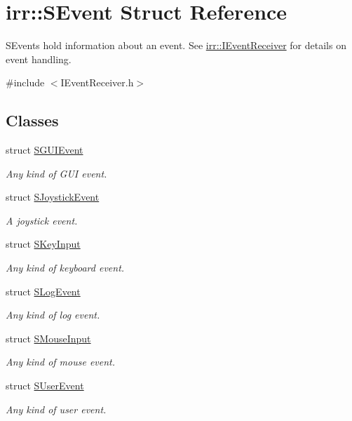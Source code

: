 \hypertarget{structirr_1_1SEvent}{}\section{irr\+:\+:S\+Event Struct Reference}
\label{structirr_1_1SEvent}


S\+Events hold information about an event. See \hyperlink{classirr_1_1IEventReceiver}{irr\+::\+I\+Event\+Receiver} for details on event handling.  




{\ttfamily \#include $<$I\+Event\+Receiver.\+h$>$}

\subsection*{Classes}
\begin{DoxyCompactItemize}
\item 
struct \hyperlink{structirr_1_1SEvent_1_1SGUIEvent}{S\+G\+U\+I\+Event}
\begin{DoxyCompactList}\small\item\em Any kind of G\+UI event. \end{DoxyCompactList}\item 
struct \hyperlink{structirr_1_1SEvent_1_1SJoystickEvent}{S\+Joystick\+Event}
\begin{DoxyCompactList}\small\item\em A joystick event. \end{DoxyCompactList}\item 
struct \hyperlink{structirr_1_1SEvent_1_1SKeyInput}{S\+Key\+Input}
\begin{DoxyCompactList}\small\item\em Any kind of keyboard event. \end{DoxyCompactList}\item 
struct \hyperlink{structirr_1_1SEvent_1_1SLogEvent}{S\+Log\+Event}
\begin{DoxyCompactList}\small\item\em Any kind of log event. \end{DoxyCompactList}\item 
struct \hyperlink{structirr_1_1SEvent_1_1SMouseInput}{S\+Mouse\+Input}
\begin{DoxyCompactList}\small\item\em Any kind of mouse event. \end{DoxyCompactList}\item 
struct \hyperlink{structirr_1_1SEvent_1_1SUserEvent}{S\+User\+Event}
\begin{DoxyCompactList}\small\item\em Any kind of user event. \end{DoxyCompactList}\end{DoxyCompactItemize}


